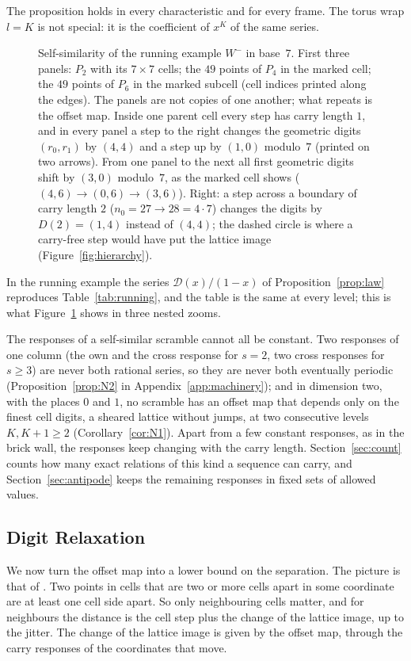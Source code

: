 The proposition holds in every characteristic and for every frame. The torus wrap $l=K$ is not special: it is the coefficient of $x^K$ of the same series.

\begin{figure}[t]
\centering
{}
\caption{Self-similarity of the running example $W^-$ in base~$7$. First three panels: $P_2$ with its $7\times7$ cells; the $49$ points of $P_4$ in the marked cell; the $49$ points of $P_6$ in the marked subcell (cell indices printed along the edges). The panels are not copies of one another; what repeats is the offset map. Inside one parent cell every step has carry length $1$, and in every panel a step to the right changes the geometric digits $(r_0,r_1)$ by $(4,4)$ and a step up by $(1,0)$ modulo~$7$ (printed on two arrows). From one panel to the next all first geometric digits shift by $(3,0)$ modulo~$7$, as the marked cell shows ($(4,6)\to(0,6)\to(3,6)$). Right: a step across a boundary of carry length $2$ ($n_0=27\to28=4\cdot7$) changes the digits by $D(2)=(1,4)$ instead of $(4,4)$; the dashed circle is where a carry-free step would have put the lattice image (Figure~\ref{fig:hierarchy}).}
\label{fig:idea}
\end{figure}

In the running example the series $\mathcal D(x)/(1-x)$ of Proposition~\ref{prop:law} reproduces Table~\ref{tab:running}, and the table is the same at every level; this is what Figure~\ref{fig:idea} shows in three nested zooms.

The responses of a self-similar scramble cannot all be constant. Two responses of one column (the own and the cross response for $s=2$, two cross responses for $s\ge3$) are never both rational series, so they are never both eventually periodic (Proposition~\ref{prop:N2} in Appendix~\ref{app:machinery}); and in dimension two, with the places $0$ and $1$, no scramble has an offset map that depends only on the finest cell digits, a sheared lattice without jumps, at two consecutive levels $K,K+1\ge2$ (Corollary~\ref{cor:N1}). Apart from a few constant responses, as in the brick wall, the responses keep changing with the carry length. Section~\ref{sec:count} counts how many exact relations of this kind a sequence can carry, and Section~\ref{sec:antipode} keeps the remaining responses in fixed sets of allowed values.

\subsection{Digit Relaxation}
We now turn the offset map into a lower bound on the separation. The picture is that of \cite{Gru26geo}. Two points in cells that are two or more cells apart in some coordinate are at least one cell side apart. So only neighbouring cells matter, and for neighbours the distance is the cell step plus the change of the lattice image, up to the jitter. The change of the lattice image is given by the offset map, through the carry responses of the coordinates that move.

